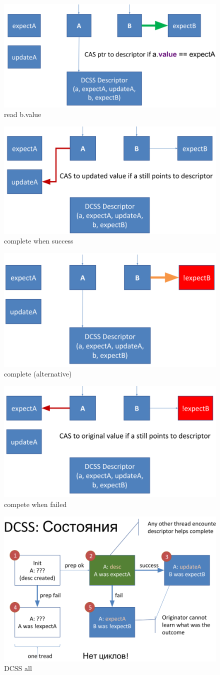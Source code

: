 \documentclass[10pt,a4paper,oneside,titlepage]{article}
\theoremstyle{plain}
\theoremstyle{defenition}
\begin{document}
\begin{figure}[h!]
	\centering
	\includegraphics[width=0.4\linewidth]{pictures/DCSS3}
	\caption{read b.value}
	\label{fig:dcss3}
\end{figure}

\begin{figure}[h!]
	\centering
	\includegraphics[width=0.4\linewidth]{pictures/DCSS4}
	\caption{complete when success}
	\label{fig:dcss4}
\end{figure}

\begin{figure}[h!]
	\centering
	\includegraphics[width=0.4\linewidth]{pictures/DCSS5}
	\caption{complete (alternative)}
	\label{fig:dcss5}
\end{figure}

\begin{figure}[h!]
	\centering
	\includegraphics[width=0.4\linewidth]{pictures/DCSS6}
	\caption{compete when failed}
	\label{fig:dcss6}
\end{figure}

\begin{figure}[h!]
	\centering
	\includegraphics[width=0.5\linewidth]{pictures/DCSS7}
	\caption{DCSS all}
	\label{fig:dcss7}
\end{figure}
\end{document}
